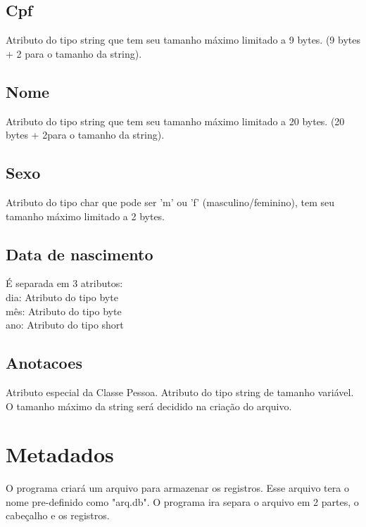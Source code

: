 \subsection{\esp Cpf}

Atributo do tipo string que tem seu tamanho máximo limitado a 9 bytes. (9 bytes + 2 para o tamanho da string).



\subsection{\esp Nome}

Atributo do tipo string que tem seu tamanho máximo limitado a 20 bytes. (20 bytes + 2para o tamanho da string).


 \subsection{\esp Sexo}

Atributo do tipo char que pode ser 'm' ou 'f' (masculino/feminino), tem seu tamanho máximo limitado a 2 bytes.



\subsection{\esp Data de nascimento}

É separada em 3 atributos:\\
dia: Atributo do tipo byte\\
mês: Atributo do tipo byte\\
ano: Atributo do tipo short
   

\subsection{\esp Anotacoes}

Atributo especial da Classe Pessoa.
Atributo do tipo string de tamanho variável. O tamanho máximo da string será decidido na criação do arquivo.
   
\section{\esp Metadados}


O programa criará um arquivo para armazenar os registros. Esse arquivo tera o nome pre-definido como "arq.db". O programa ira separa o arquivo em 2 partes, o cabeçalho e os registros.


